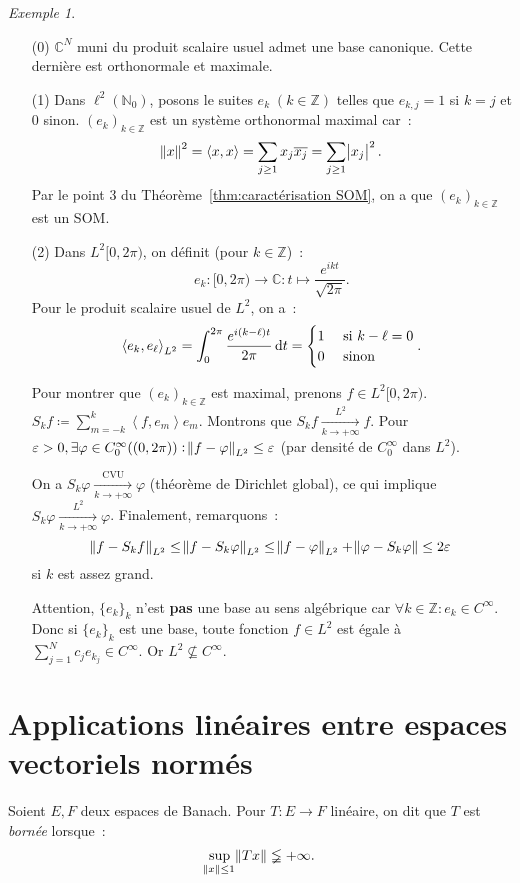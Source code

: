 \documentclass{report}
\newcommand{\C}{{\mathbb C}}
\newcommand{\Z}{{\mathbb Z}}
\newcommand{\N}{{\mathbb N}}
\newcommand{\scpr}[2]{\left\langle#1, #2\right\rangle}
\newcommand{\pinfty}{{+\infty}}
\theoremstyle{definition}
\theoremstyle{remark}
\newtheorem{ex}{Exemple}[chapter]
\begin{document}
\begin{ex}~
\begin{itemize}
	\item[(0)] $\C^N$ muni du produit scalaire usuel admet une base canonique. Cette dernière est orthonormale et maximale.
	\item[(1)] Dans $\ell^2(\N_0)$, posons le suites $e_k \; (k \in \Z)$ telles que $e_{k,j} = 1$ si $k=j$ et $0$ sinon. $(e_k)_{k \in \Z}$ est un système orthonormal maximal car~:
	\[\norm x^2 = \scpr xx = \sum_{j \geq 1}x_j\overline {x_j} = \sum_{j \geq 1}\abs {x_j}^2.\]
	Par le point 3 du Théorème~\ref{thm:caractérisation SOM}, on a que $(e_k)_{k \in \Z}$ est un SOM.
	\item[(2)] Dans $L^2[0, 2\pi)$, on définit (pour $k \in \Z$)~:
	\[e_k : [0, 2\pi) \to \C : t \mapsto \frac {e^{ikt}}{\sqrt {2\pi}}.\]
	Pour le produit scalaire usuel de $L^2$, on a~:
	\[\scpr {e_k}{e_\ell}_{L^2} = \int_0^{2\pi}\frac {e^{i(k-\ell)t}}{2\pi}\dif t = \begin{cases}1 &\text{ si } k-\ell = 0 \\0 &\text{ sinon}\end{cases}.\]

	Pour montrer que $(e_k)_{k \in \Z}$ est maximal, prenons $f \in L^2[0, 2\pi)$. $S_kf \coloneqq \sum_{m=-k}^k\scpr f{e_m}e_m.$ Montrons que $S_kf \xrightarrow[k \to \pinfty]{L^2} f$.
	Pour $\varepsilon > 0, \exists \varphi \in C_0^\infty((0, 2\pi)) : \norm {f-\varphi}_{L^2} \leq \varepsilon$ (par densité de $C_0^\infty$ dans $L^2$).

	On a $S_k\varphi \xrightarrow[k \to \pinfty]{\text{CVU}} \varphi$ (théorème de Dirichlet global), ce qui implique $S_k\varphi \xrightarrow[k \to \pinfty]{L^2} \varphi$.
	Finalement, remarquons~:
	\[\norm {f-S_kf}_{L^2} \leq \norm {f-S_k\varphi}_{L^2} \leq \norm {f-\varphi}_{L^2} + \norm {\varphi - S_k\varphi} \leq 2\varepsilon\]
	si $k$ est assez grand.

	Attention, $\{e_k\}_k$ n'est \textbf{pas} une base au sens algébrique car $\forall k \in \Z : e_k \in C^\infty$. Donc si $\{e_k\}_k$ est une base, toute fonction $f \in L^2$ est
	égale à $\sum_{j=1}^Nc_je_{k_j} \in C^\infty$. Or $L^2 \not \subseteq C^\infty$.
\end{itemize}
\end{ex}

\section{Applications linéaires entre espaces vectoriels normés}
Soient $E, F$ deux espaces de Banach. Pour $T : E \to F$ linéaire, on dit que $T$ est \textit{bornée} lorsque~:
\[\sup_{\norm x \leq 1}\norm {Tx} \lneqq \pinfty.\]
\end{document}
